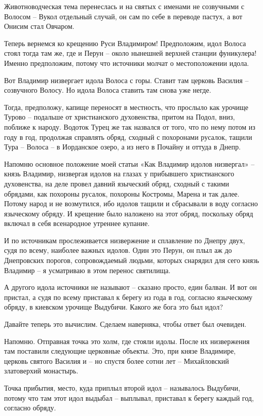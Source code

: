 \documentclass[a5paper,11pt,openany]{article}
\begin{document}
 Животноводческая тема перенеслась и на святых с именами не созвучными с Волосом – Вукол отдельный случай, он сам по себе в переводе пастух, а вот Онисим стал Овчаром.

  Теперь вернемся ко крещению Руси Владимиром! Предположим, идол Волоса стоял тогда там же, где и Перун – около нынешней верхней станции фуникулера! Именно предположим, потому что источники молчат о местоположении идола.

  Вот Владимир низвергает идола Волоса с горы. Ставит там церковь Василия – созвучного Волосу. Но идола Волоса ставить там снова уже негде.

   Тогда, предположу, капище переносят в местность, что прослыло как урочище Турово – подальше от христианского духовенства, притом на Подол, вниз, поближе к народу. Водоток Турец же так назвался от того, что по нему потом из году в год, продолжая справлять обряд, сходный с похоронами русалок, тащили Тура – Волоса – в Иорданское озеро, а из него в Почайну и оттуда в Днепр.

    Напомню основное положение моей статьи «Как Владимир идолов низвергал» – князь Владимир, низвергая идолов на глазах у прибывшего христианского духовенства, на деле провел давний языческий обряд, сходный с такими обрядами, как похороны русалок, похороны Костромы, Марена и так далее. Потому народ и не возмутился, ибо идолов тащили и сбрасывали в воду согласно языческому обряду. И крещение было наложено на этот обряд, поскольку обряд включал в себя всенародное утреннее купание.

   И по источникам прослеживается низвержение и сплавление по Днепру двух, судя по всему, наиболее важных идолов. Один это Перун, он плыл аж до Днепровских порогов,  сопровождаемый людьми, которых снарядил для сего князь Владимир – я усматриваю в этом перенос святилища. 

А другого идола источники не называют – сказано просто, един балван. И вот он пристал, а судя по всему приставал к берегу из года в год, согласно языческому обряду, в киевском урочище Выдубичи. Какого же бога это был идол?

   Давайте теперь это вычислим. Сделаем наверняка, чтобы ответ был очевиден.

   Напомню. Отправная точка это холм, где стояли идолы. После их низвержения там поставили следующие церковные объекты. Это, при князе Владимире, церковь святого Василия и – но спустя более сотни лет – Михайловский златоверхий монастырь.

    Точка прибытия, место, куда приплыл второй идол – называлось Выдубичи, потому что там этот идол выдыбал – выплывал, приставал к берегу каждый год, согласно обряду. 
\end{document}
